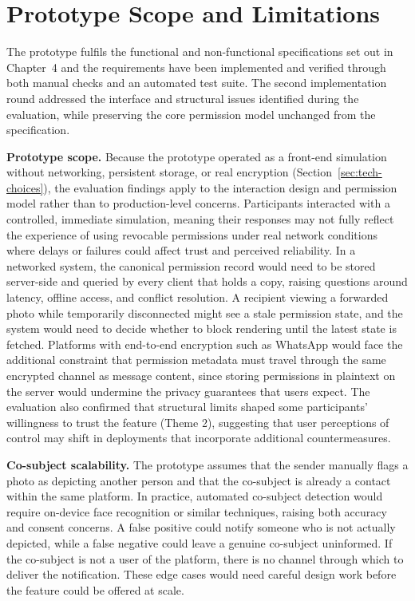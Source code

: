 \section{Prototype Scope and Limitations }
\label{sec:production-limitations}
The prototype fulfils the functional and non-functional specifications set out in Chapter~4 and the requirements have been implemented and verified through both manual checks and an automated test suite. The second implementation round addressed the interface and structural issues identified during the evaluation, while preserving the core permission model unchanged from the specification.

\textbf{Prototype scope.} Because the prototype operated as a front-end simulation without networking, persistent storage, or real encryption (Section~\ref{sec:tech-choices}), the evaluation findings apply to the interaction design and permission model rather than to production-level concerns. Participants interacted with a controlled, immediate simulation, meaning their responses may not fully reflect the experience of using revocable permissions under real network conditions where delays or failures could affect trust and perceived reliability. In a networked system, the canonical permission record would need to be stored server-side and queried by every client that holds a copy, raising questions around latency, offline access, and conflict resolution. A recipient viewing a forwarded photo while temporarily disconnected might see a stale permission state, and the system would need to decide whether to block rendering until the latest state is fetched. Platforms with end-to-end encryption such as WhatsApp would face the additional constraint that permission metadata must travel through the same encrypted channel as message content, since storing permissions in plaintext on the server would undermine the privacy guarantees that users expect. The evaluation also confirmed that structural limits shaped some participants' willingness to trust the feature (Theme 2), suggesting that user perceptions of control may shift in deployments that incorporate additional countermeasures.


\textbf{Co-subject scalability.} The prototype assumes that the sender manually flags a photo as depicting another person and that the co-subject is already a contact within the same platform. In practice, automated co-subject detection would require on-device face recognition or similar techniques, raising both accuracy and consent concerns. A false positive could notify someone who is not actually depicted, while a false negative could leave a genuine co-subject uninformed. If the co-subject is not a user of the platform, there is no channel through which to deliver the notification. These edge cases would need careful design work before the feature could be offered at scale.

